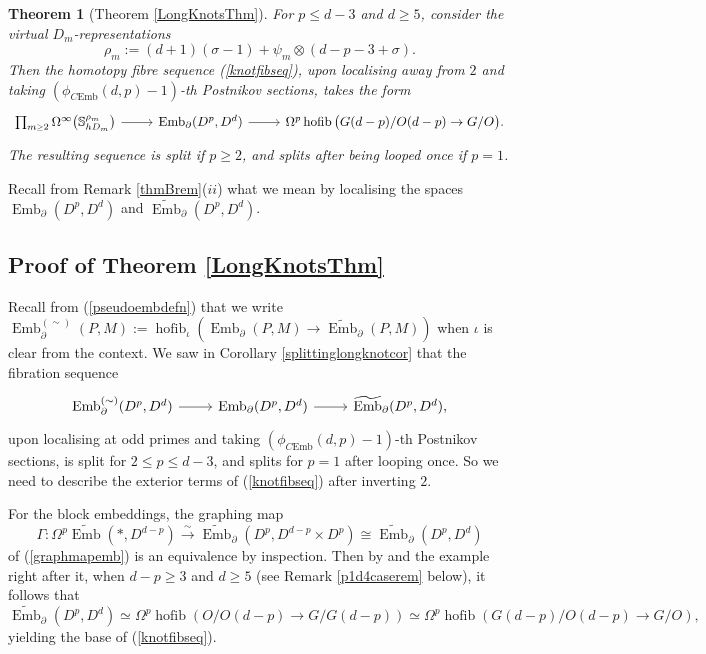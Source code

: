 \documentclass[a4paper, oneside]{amsart}
\newcommand{\emb}{\operatorname{Emb}}
\newcommand{\bemb}{\widetilde{\operatorname{Emb}}}
\newcommand{\hofib}{\operatorname{hofib}}
\newcommand{\cemb}{C\mathrm{Emb}}
\newcommand{\1}{\mathds{1}}
\newtheorem*{thm*}{Theorem}
\theoremstyle{remark}
\theoremstyle{definition}
\newcommand{\geqs}{\scaleobj{0.85}{\geq}}
\newcommand{\s}{\mathbb{S}}
\newcommand{\pemb}{\operatorname{Emb}^{(\sim)}}
\numberwithin{equation}{section}
\begin{document}
\begin{thm*}[Theorem \ref{LongKnotsThm}]
For $p\leq d-3$ and $d\geq 5$, consider the virtual $D_m$-representations
$$
    \rho_m:=(d+1)(\sigma-1)+\psi_m\otimes(d-p-3+\sigma).
$$  
    Then the homotopy fibre sequence (\ref{knotfibseq}), upon localising away from $2$ and taking $(\phi_{\cemb}(d,p)-1)$-th Postnikov sections, takes the form
$$
 \begin{tikzcd}
\prod_{m\geqs 2} \Omega^{\infty}\big(\s^{\rho_m}_{hD_m}\big)\rar&\emb_\partial(D^p, D^d)\rar&\Omega^{p}\hofib\big(G(d-p)/O(d-p)\to G/O\big).
\end{tikzcd}
$$
    The resulting sequence is split if $p\geq 2$, and splits after being looped once if $p=1$.
\end{thm*}

Recall from Remark \ref{thmBrem}($ii$) what we mean by localising the spaces $\emb_\partial(D^p,D^d)$ and $\bemb_\partial(D^p,D^d)$.




\subsection{Proof of Theorem \ref{LongKnotsThm}} \label{outlineproofsection}
Recall from (\ref{pseudoembdefn}) that we write $\emb_\partial^{(\sim)}(P,M):=\hofib_\iota(\emb_\partial(P,M)\to \bemb_\partial(P,M))$ when $\iota$ is clear from the context. We saw in Corollary \ref{splittinglongknotcor} that the fibration sequence
\begin{equation}\label{knotfibseq}
\begin{tikzcd}
\pemb_\partial(D^p,D^d)\rar & \emb_\partial(D^p, D^d)\rar & \bemb_{\partial}(D^p,D^d),
\end{tikzcd}
\end{equation}
upon localising at odd primes and taking $(\phi_{\cemb}(d,p)-1)$-th Postnikov sections, is split for $2\leq p\leq d-3$, and splits for $p=1$ after looping once. So we need to describe the exterior terms of (\ref{knotfibseq}) after inverting $2$.

For the block embeddings, the graphing map 
\begin{equation}\label{blockgraphingmap}
\Gamma: \Omega^p\bemb(*,D^{d-p})\overset{\sim}\longrightarrow \bemb_\partial(D^p,D^{d-p}\times D^p)\cong \bemb_\partial(D^p,D^{d})
\end{equation}
of (\ref{graphmapemb}) is an equivalence by inspection. Then by \cite[Thm. 2.2.1]{GoodwillieKleinWeiss} and the example right after it, when $d-p\geq 3$ and $d\geq 5$ (see Remark \ref{p1d4caserem} below), it follows that
\begin{equation}\label{blocklongknotequiv}
    \bemb_\partial(D^p,D^d)\simeq \Omega^p\hofib(O/O(d-p)\to G/G(d-p))\simeq \Omega^p\hofib(G(d-p)/O(d-p)\to G/O),
\end{equation}
yielding the base of (\ref{knotfibseq}). 
\end{document}

